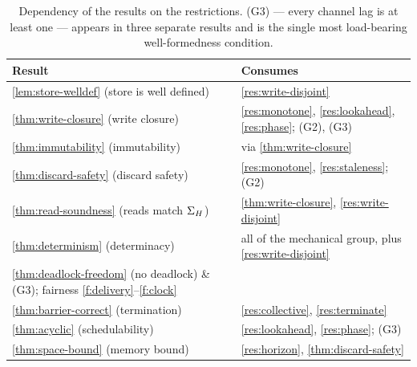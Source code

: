 \begin{table}[htbp]
\centering
\small
\begin{tabularx}{\textwidth}{@{}>{\raggedright\arraybackslash}p{5.2cm}
                                >{\raggedright\arraybackslash}X@{}}
\toprule
\textbf{Result} & \textbf{Consumes} \\
\midrule
\cref{lem:store-welldef} (store is well defined)
 & \cref{res:write-disjoint} \\
\cref{thm:write-closure} (write closure)
 & \cref{res:monotone}, \cref{res:lookahead}, \cref{res:phase}; (G2), (G3) \\
\cref{thm:immutability} (immutability)
 & via \cref{thm:write-closure} \\
\cref{thm:discard-safety} (discard safety)
 & \cref{res:monotone}, \cref{res:staleness}; (G2) \\
\cref{thm:read-soundness} (reads match $\Sigma_{H}$)
 & \cref{thm:write-closure}, \cref{res:write-disjoint} \\
\cref{thm:determinism} (determinacy)
 & all of the mechanical group, plus \cref{res:write-disjoint} \\
\cref{thm:deadlock-freedom} (no deadlock)
 \& (G3); fairness \ref{f:delivery}--\ref{f:clock} \\
\cref{thm:barrier-correct} (termination)
 & \cref{res:collective}, \cref{res:terminate} \\
\cref{thm:acyclic} (schedulability)
 & \cref{res:lookahead}, \cref{res:phase}; (G3) \\
\cref{thm:space-bound} (memory bound)
 & \cref{res:horizon}, \cref{thm:discard-safety} \\
\bottomrule
\end{tabularx}
\caption{Dependency of the results on the restrictions. (G3) --- every
channel lag is at least one --- appears in three separate results and
is the single most load-bearing well-formedness condition.}
\label{tab:result-deps}
\end{table}
